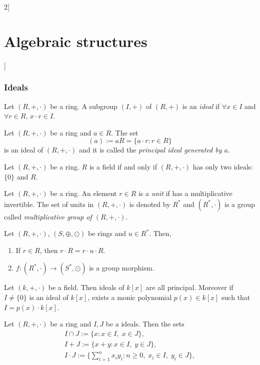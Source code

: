 \documentclass[../../../main.tex]{subfiles}
\begin{document}
\begin{multicols}{2}[\section{Algebraic structures}]
\subsubsection*{Ideals}
\begin{definition}
    Let $(R,+,\cdot)$ be a ring. A subgroup $(I,+)$ of $(R,+)$ is an \textit{ideal} if $\forall x\in I$ and $\forall r\in R$, $x\cdot r\in I$.
\end{definition}
\begin{lemma}
    Let $(R,+,\cdot)$ be a ring and $a\in R$. The set $$(a):=aR=\{a\cdot r:r\in R\}$$ is an ideal of $(R,+,\cdot)$ and it is called the \textit{principal ideal generated by $a$}.
\end{lemma}
\begin{prop}
    Let $(R,+,\cdot)$ be a ring. $R$ is a field if and only if $(R,+,\cdot)$ has only two ideals: $\{0\}$ and $R$.
\end{prop}
\begin{definition}
    Let $(R,+,\cdot)$ be a ring. An element $r\in R$ is a \textit{unit} if has a multiplicative invertible. The set of units in $(R,+,\cdot)$ is denoted by $R^*$ and $(R^*,\cdot)$ is a group called \textit{multiplicative group of $(R,+,\cdot)$}.
\end{definition}
\begin{lemma}
    Let $(R,+,\cdot)$, $(S,\oplus,\odot)$ be rings and $u\in R^*$. Then,
    \begin{enumerate}
        \item If $r\in R$, then $r\cdot R=r\cdot u\cdot R$.
        \item $f:(R^*,\cdot)\rightarrow (S^*,\odot)$ is a group morphism.
    \end{enumerate}
\end{lemma}
\begin{prop}
    Let $(k,+,\cdot)$ be a field. Then ideals of $k[x]$ are all principal. Moreover if $I\ne\{0\}$ is an ideal of $k[x]$, exists a monic polynomial $p(x)\in k[x]$ such that $I=p(x)\cdot k[x]$.
\end{prop}
\begin{prop}
    Let $(R,+,\cdot)$ be a ring and $I, J$ be a ideals. Then the sets
    \begin{gather*}
        I\cap J:=\{x:x\in I,\;x\in J\},\\
        I+J:=\{x+y:x\in I,\;y\in J\},\\
        I\cdot J:=\{\sum_{i=1}^nx_iy_i:n\geq 0,\;x_i\in I,\;y_i\in J\},
    \end{gather*}

\end{prop}
\end{multicols}
\end{document}
